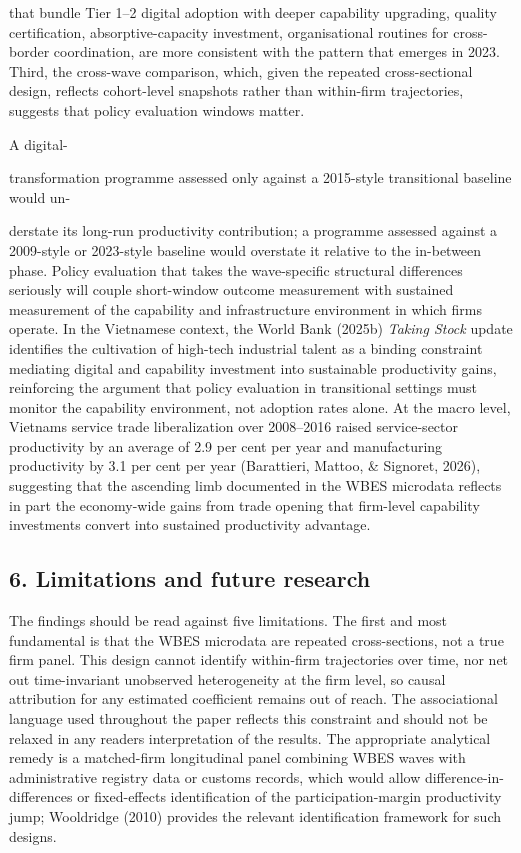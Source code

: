 \documentclass[12pt,a4paper]{article}
\begin{document}
that bundle Tier 1--2 digital adoption with deeper capability upgrading,
quality certification, absorptive-capacity investment, organisational
routines for cross-border coordination, are more consistent with the
pattern that emerges in 2023. Third, the cross-wave comparison, which,
given the repeated cross-sectional design, reflects cohort-level
snapshots rather than within-firm trajectories, suggests that policy
evaluation windows matter.

A digital-

transformation programme assessed only against a 2015-style transitional
baseline would un-

derstate its long-run productivity contribution; a programme assessed
against a 2009-style or 2023-style baseline would overstate it relative
to the in-between phase. Policy evaluation that takes the wave-specific
structural differences seriously will couple short-window outcome
measurement with sustained measurement of the capability and
infrastructure environment in which firms operate. In the Vietnamese
context, the World Bank (2025b) \emph{Taking Stock} update identifies
the cultivation of high-tech industrial talent as a binding constraint
mediating digital and capability investment into sustainable
productivity gains, reinforcing the argument that policy evaluation in
transitional settings must monitor the capability environment, not
adoption rates alone. At the macro level, Vietnam\textquotesingle s
service trade liberalization over 2008--2016 raised service-sector
productivity by an average of 2.9 per cent per year and manufacturing
productivity by 3.1 per cent per year (Barattieri, Mattoo, \& Signoret,
2026), suggesting that the ascending limb documented in the WBES
microdata reflects in part the economy-wide gains from trade opening
that firm-level capability investments convert into sustained
productivity advantage.

\hypertarget{6-limitations-and-future-research}{%
\subsection{6. Limitations and future
research}\label{6-limitations-and-future-research}}

The findings should be read against five limitations. The first and most
fundamental is that the WBES microdata are repeated cross-sections, not
a true firm panel. This design cannot identify within-firm trajectories
over time, nor net out time-invariant unobserved heterogeneity at the
firm level, so causal attribution for any estimated coefficient remains
out of reach. The associational language used throughout the paper
reflects this constraint and should not be relaxed in any
reader\textquotesingle s interpretation of the results. The appropriate
analytical remedy is a matched-firm longitudinal panel combining WBES
waves with administrative registry data or customs records, which would
allow difference-in-differences or fixed-effects identification of the
participation-margin productivity jump; Wooldridge (2010) provides the
relevant identification framework for such designs.
\end{document}
